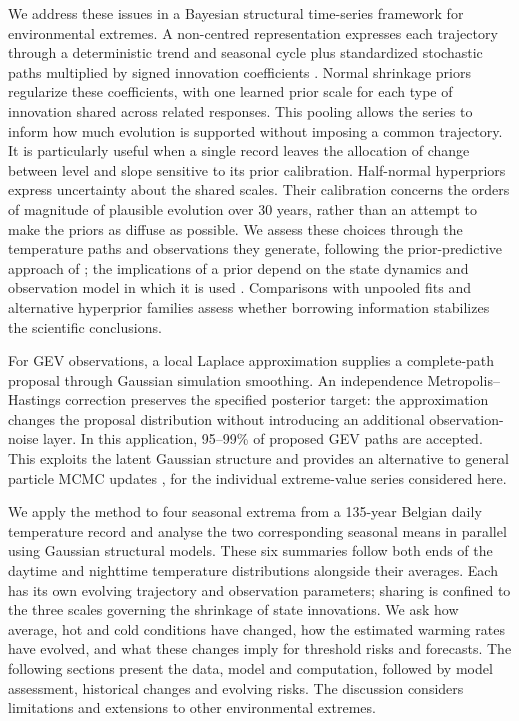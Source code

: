 \documentclass[11pt,a4paper]{article}
\begin{document}
	We address these issues in a Bayesian structural time-series framework for environmental extremes. A non-centred representation expresses each trajectory through a deterministic trend and seasonal cycle plus standardized stochastic paths multiplied by signed innovation coefficients \citep{fruhwirthschnatter2010}. Normal shrinkage priors regularize these coefficients, with one learned prior scale for each type of innovation shared across related responses. This pooling allows the series to inform how much evolution is supported without imposing a common trajectory. It is particularly useful when a single record leaves the allocation of change between level and slope sensitive to its prior calibration. Half-normal hyperpriors express uncertainty about the shared scales. Their calibration concerns the orders of magnitude of plausible evolution over 30 years, rather than an attempt to make the priors as diffuse as possible. We assess these choices through the temperature paths and observations they generate, following the prior-predictive approach of \citet{gabry2019}; the implications of a prior depend on the state dynamics and observation model in which it is used \citep{gelman2017prior}. Comparisons with unpooled fits and alternative hyperprior families assess whether borrowing information stabilizes the scientific conclusions.
	
	For GEV observations, a local Laplace approximation supplies a complete-path proposal through Gaussian simulation smoothing. An independence Metropolis--Hastings correction preserves the specified posterior target: the approximation changes the proposal distribution without introducing an additional observation-noise layer. In this application, 95--99\% of proposed GEV paths are accepted. This exploits the latent Gaussian structure and provides an alternative to general particle MCMC updates \citep{andrieu2010,lindsten2014}, for the individual extreme-value series considered here.
	
	We apply the method to four seasonal extrema from a 135-year Belgian daily temperature record and analyse the two corresponding seasonal means in parallel using Gaussian structural models. These six summaries follow both ends of the daytime and nighttime temperature distributions alongside their averages. Each has its own evolving trajectory and observation parameters; sharing is confined to the three scales governing the shrinkage of state innovations. We ask how average, hot and cold conditions have changed, how the estimated warming rates have evolved, and what these changes imply for threshold risks and forecasts. The following sections present the data, model and computation, followed by model assessment, historical changes and evolving risks. The discussion considers limitations and extensions to other environmental extremes.
	
\end{document}
